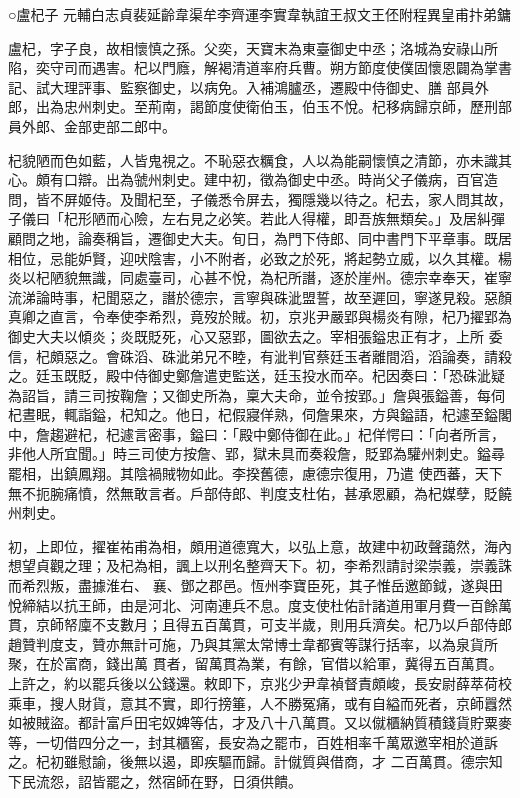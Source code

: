 
\begin{pinyinscope}

 ○盧杞子
 元輔白志貞裴延齡韋渠牟李齊運李實韋執誼王叔文王伾附程異皇甫抃弟鏞



 盧杞，字子良，故相懷慎之孫。父奕，天寶末為東臺御史中丞；洛城為安祿山所陷，奕守司而遇害。杞以門廕，解褐清道率府兵曹。朔方節度使僕固懷恩闢為掌書記、試大理評事、監察御史，以病免。入補鴻臚丞，遷殿中侍御史、膳
 部員外郎，出為忠州刺史。至荊南，謁節度使衛伯玉，伯玉不悅。杞移病歸京師，歷刑部員外郎、金部吏部二郎中。



 杞貌陋而色如藍，人皆鬼視之。不恥惡衣糲食，人以為能嗣懷慎之清節，亦未識其心。頗有口辯。出為虢州刺史。建中初，徵為御史中丞。時尚父子儀病，百官造問，皆不屏姬侍。及聞杞至，子儀悉令屏去，獨隱幾以待之。杞去，家人問其故，子儀曰「杞形陋而心險，左右見之必笑。若此人得權，即吾族無類矣。」及居糾彈顧問之地，論奏稱旨，遷御史大夫。旬日，為門下侍郎、同中書門下平章事。既居相位，忌能妒賢，迎吠陰害，小不附者，必致之於死，將起勢立威，以久其權。楊炎以杞陋貌無識，同處臺司，心甚不悅，為杞所譖，逐於崖州。德宗幸奉天，崔寧流涕論時事，杞聞惡之，譖於德宗，言寧與硃泚盟誓，故至遲回，寧遂見殺。惡顏真卿之直言，令奉使李希烈，竟歿於賊。初，京兆尹嚴郢與楊炎有隙，杞乃擢郢為御史大夫以傾炎；炎既貶死，心又惡郢，圖欲去之。宰相張鎰忠正有才，上所
 委信，杞頗惡之。會硃滔、硃泚弟兄不睦，有泚判官蔡廷玉者離間滔，滔論奏，請殺之。廷玉既貶，殿中侍御史鄭詹遣吏監送，廷玉投水而卒。杞因奏曰：「恐硃泚疑為詔旨，請三司按鞠詹；又御史所為，稟大夫命，並令按郢。」詹與張鎰善，每伺杞晝眠，輒詣鎰，杞知之。他日，杞假寢佯熟，伺詹果來，方與鎰語，杞遽至鎰閣中，詹趨避杞，杞遽言密事，鎰曰：「殿中鄭侍御在此。」杞佯愕曰：「向者所言，非他人所宜聞。」時三司使方按詹、郢，獄未具而奏殺詹，貶郢為驩州刺史。鎰尋罷相，出鎮鳳翔。其陰禍賊物如此。李揆舊德，慮德宗復用，乃遣
 使西蕃，天下無不扼腕痛憤，然無敢言者。戶部侍郎、判度支杜佑，甚承恩顧，為杞媒孽，貶饒州刺史。



 初，上即位，擢崔祐甫為相，頗用道德寬大，以弘上意，故建中初政聲藹然，海內想望貞觀之理；及杞為相，諷上以刑名整齊天下。初，李希烈請討梁崇義，崇義誅而希烈叛，盡據淮右、
 襄、鄧之郡邑。恆州李寶臣死，其子惟岳邀節鉞，遂與田悅締結以抗王師，由是河北、河南連兵不息。度支使杜佑計諸道用軍月費一百餘萬貫，京師帑廩不支數月；且得五百萬貫，可支半歲，則用兵濟矣。杞乃以戶部侍郎趙贊判度支，贊亦無計可施，乃與其黨太常博士韋都賓等謀行括率，以為泉貨所聚，在於富商，錢出萬
 貫者，留萬貫為業，有餘，官借以給軍，冀得五百萬貫。上許之，約以罷兵後以公錢還。敕即下，京兆少尹韋禎督責頗峻，長安尉薛萃荷校乘車，搜人財貨，意其不實，即行搒箠，人不勝冤痛，或有自縊而死者，京師囂然如被賊盜。都計富戶田宅奴婢等估，才及八十八萬貫。又以僦櫃納質積錢貨貯粟麥等，一切借四分之一，封其櫃窖，長安為之罷市，百姓相率千萬眾邀宰相於道訴之。杞初雖慰諭，後無以遏，即疾驅而歸。計僦質與借商，才
 二百萬貫。德宗知下民流怨，詔皆罷之，然宿師在野，日須供饋。




\end{pinyinscope}
